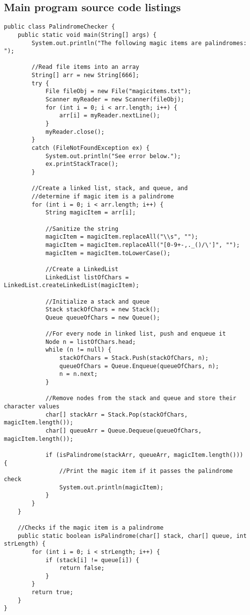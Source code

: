 \documentclass[letterpaper, 10pt,DIV=13]{scrartcl}
\numberwithin{equation}{section} %
\numberwithin{figure}{section} %
\numberwithin{table}{section} %
\begin{document}
\subsection{Main program source code listings}
\lstset{numbers=left, numberstyle=\tiny, stepnumber=1, numbersep=5pt, basicstyle=\footnotesize\ttfamily}
\begin{lstlisting}[frame=single, ] 
public class PalindromeChecker {
    public static void main(String[] args) {
        System.out.println("The following magic items are palindromes: ");
        
        //Read file items into an array
        String[] arr = new String[666];
        try {
            File fileObj = new File("magicitems.txt");
            Scanner myReader = new Scanner(fileObj);
            for (int i = 0; i < arr.length; i++) {
                arr[i] = myReader.nextLine();
            }
            myReader.close();
        }
        catch (FileNotFoundException ex) {
            System.out.println("See error below.");
            ex.printStackTrace();
        }

        //Create a linked list, stack, and queue, and
        //determine if magic item is a palindrome
        for (int i = 0; i < arr.length; i++) {
            String magicItem = arr[i];

            //Sanitize the string
            magicItem = magicItem.replaceAll("\\s", "");
            magicItem = magicItem.replaceAll("[0-9+-,._()/\']", "");
            magicItem = magicItem.toLowerCase();

            //Create a LinkedList
            LinkedList listOfChars = LinkedList.createLinkedList(magicItem);

            //Initialize a stack and queue
            Stack stackOfChars = new Stack();
            Queue queueOfChars = new Queue();

            //For every node in linked list, push and enqueue it
            Node n = listOfChars.head;
            while (n != null) {
                stackOfChars = Stack.Push(stackOfChars, n);
                queueOfChars = Queue.Enqueue(queueOfChars, n);
                n = n.next;
            }

            //Remove nodes from the stack and queue and store their character values
            char[] stackArr = Stack.Pop(stackOfChars, magicItem.length());
            char[] queueArr = Queue.Dequeue(queueOfChars, magicItem.length());

            if (isPalindrome(stackArr, queueArr, magicItem.length())) {
                //Print the magic item if it passes the palindrome check
                System.out.println(magicItem);
            }
        }
    }

    //Checks if the magic item is a palindrome
    public static boolean isPalindrome(char[] stack, char[] queue, int strLength) {
        for (int i = 0; i < strLength; i++) {
            if (stack[i] != queue[i]) {
                return false;
            }
        }
        return true;
    }
}
\end{lstlisting}
\end{document}
